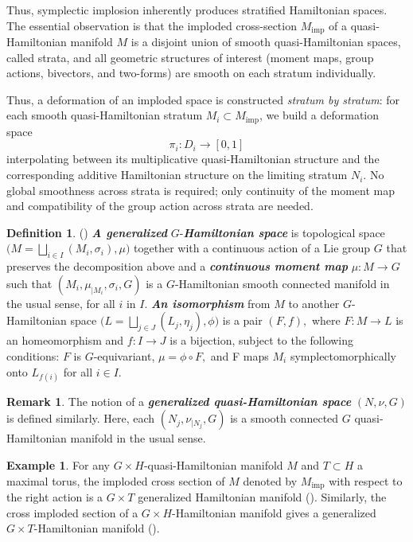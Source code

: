\documentclass[reqno]{amsart}
\theoremstyle{plain}
\theoremstyle{definition}
\newtheorem{Def}[Thm]{Definition}
\newtheorem{Rem}[Thm]{Remark}
\newtheorem{Exp}[Thm]{Example}
\newcommand{\defn}[1]{\textbf{\textit{#1}}}
\newcommand{\too}{\longrightarrow}
\newcommand{\imp}{\text{imp}}
\begin{document}
Thus, symplectic implosion inherently produces stratified Hamiltonian spaces. The essential observation is that the imploded cross-section $M_{\mathrm{imp}}$ of a quasi-Hamiltonian manifold $M$ is a disjoint union of smooth quasi-Hamiltonian spaces, called strata, and all geometric structures of interest (moment maps, group actions, bivectors, and two-forms) are smooth on each stratum individually.

Thus, a deformation of an imploded space is constructed \emph{stratum by 
stratum}: for each smooth quasi-Hamiltonian stratum $M_i \subset M_{\mathrm{imp}}$, we 
build a deformation space
\[
    \pi_i: D_i \longrightarrow [0,1]
\]
interpolating between its multiplicative quasi-Hamiltonian structure and the corresponding additive Hamiltonian structure on the limiting stratum $N_i$. No global smoothness across strata is required; only continuity of the moment map and compatibility of the group action across strata are needed.

\begin{Def} (\cite[]{guillemin2002}) \label{gen}
\defn{A generalized} $G$-\defn{Hamiltonian space} is topological space $\Big(M = \bigsqcup_{i\in I} (M_i,\sigma_i),\mu \Big)$ together with a continuous action of a Lie group $G$ that preserves the decomposition above and a \defn{continuous moment map} $\mu: M\too G$ such that  $(M_{i},\mu_{|M_{i}},\sigma_i,G)$ is a $G$-Hamiltonian smooth connected manifold in the usual sense, for all $i$ in $I.$ \defn{An isomorphism} from $M$ to another $G$-Hamiltonian space $\Big(L = \bigsqcup_{j\in J} (L_j,\eta_j),\phi \Big)$ is a pair $(F,f),$ where $F: M\too L$ is an homeomorphism and $f:I\too J$ is a bijection, subject to the following conditions: $F$ is $G$-equivariant, $\mu = \phi\circ F,$ and F maps $M_i$ symplectomorphically onto $L_{f(i)}$ for all $i\in I.$ 
\end{Def}

\begin{Rem}
The notion of a \defn{generalized quasi-Hamiltonian space} $(N,\nu,G)$ is defined similarly. Here, each $(N_{j},\nu_{|N_{j}},G)$ is a smooth connected $G$ quasi-Hamiltonian manifold in the usual sense.
\end{Rem}

\begin{Exp}
For any $G\times H$-quasi-Hamiltonian manifold $M$ and $T \subset H$ a maximal torus, the imploded cross section of $M$ denoted by $M_\imp$ with respect to the right action is a $G\times T$ generalized Hamiltonian manifold (\cite[]{hurtubise2006group}). Similarly, the cross imploded section of a  $G\times H$-Hamiltonian manifold gives a generalized $G\times T$-Hamiltonian manifold (\cite[]{guillemin2002}). 
\end{Exp}
\end{document}
